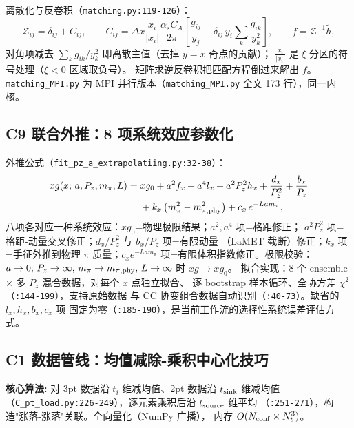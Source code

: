 \documentclass[UTF8]{ctexart}
\begin{document}
离散化与反卷积（\texttt{matching.py:119-126}）：
\begin{equation}\label{eq:mat}
\mathcal{Z}_{ij} = \delta_{ij} + C_{ij},\qquad
C_{ij} = \Delta x\frac{x_i}{|x_i|}\frac{\alpha_s C_A}{2\pi}\left[
\frac{g_{ij}}{y_j} - \delta_{ij}\, y_i\sum_k \frac{g_{ik}}{y_k^2}\right],
\qquad f = \mathcal{Z}^{-1}\tilde h,
\end{equation}
对角项减去 $\sum_k g_{ik}/y_k^2$ 即离散主值（去掉 $y=x$ 奇点的贡献）；
$\frac{x_i}{|x_i|}$ 是 $\xi$ 分区的符号处理（$\xi<0$ 区域取负号）。
矩阵求逆反卷积把匹配方程倒过来解出 $f$。\texttt{matching\_MPI.py} 为 MPI
并行版本（\texttt{matching\_MPI.py} 全文 173 行），同一内核。

\subsection{C9 联合外推：8 项系统效应参数化}

外推公式（\texttt{fit\_pz\_a\_extrapolatiing.py:32-38}）：
\begin{equation}\label{eq:extrap}
\begin{split}
xg(x;\,a,P_z,m_\pi,L) ={}& xg_0 + a^2 f_x + a^4 l_x + a^2 P_z^2 h_x + \frac{d_x}{P_z^2}
+ \frac{b_x}{P_z} \\
&+ k_x\left(m_\pi^2 - m_{\pi,\rm phy}^2\right) + c_x\, e^{-L a m_\pi},
\end{split}
\end{equation}
八项各对应一种系统效应：$xg_0$=物理极限结果；$a^2,a^4$ 项=格距修正；
$a^2P_z^2$ 项=格距-动量交叉修正；$d_x/P_z^2$ 与 $b_x/P_z$ 项=有限动量
（LaMET 截断）修正；$k_x$ 项=手征外推到物理 $\pi$ 质量；$c_x e^{-La m_\pi}$
项=有限体积指数修正。极限校验：$a\to0,\,P_z\to\infty,\,m_\pi\to m_{\pi,\rm phy},
\,L\to\infty$ 时 $xg\to xg_0$。
拟合实现：8 个 ensemble $\times$ 多 $P_z$ 混合数据，对每个 $x$ 点独立拟合、
逐 bootstrap 样本循环、全协方差 $\chi^2$（\texttt{:144-199}），支持原始数据
与 CC 协变组合数据自动识别（\texttt{:40-73}）。缺省的 $l_x,h_x,b_x,c_x$ 项
固定为零（\texttt{:185-190}），是当前工作流的选择性系统误差评估方式。

\subsection{C1 数据管线：均值减除-乘积中心化技巧}

\begin{algobox}
\textbf{核心算法:} 对 3pt 数据沿 $t_i$ 维减均值、2pt 数据沿 $t_{\rm sink}$ 维减均值
（\texttt{C\_pt\_load.py:226-249}），逐元素乘积后沿 $t_{\rm source}$ 维平均
（\texttt{:251-271}），构造"涨落-涨落"关联。全向量化（NumPy 广播），
内存 $O(N_{\rm conf}\times N_t^3)$。
\end{algobox}
\end{document}
